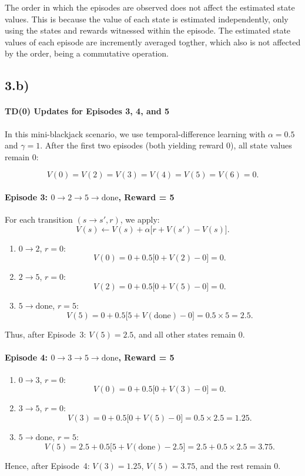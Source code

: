 \documentclass[11pt]{article}
\begin{document}
The order in which the episodes are observed does not affect the estimated state values. This is because the value of each state is estimated independently, 
only using the states and rewards witnessed within the episode. The estimated state values of each episode are incremently averaged togther, 
which also is not affected by the order, being a commutative operation.

\subsection*{3.b)}
\paragraph*{TD(0) Updates for Episodes 3, 4, and 5}

In this mini-blackjack scenario, we use temporal-difference learning with
$\alpha = 0.5$ and $\gamma = 1$. After the first two episodes (both yielding
reward 0), all state values remain 0:

\[
V(0) = V(2) = V(3) = V(4) = V(5) = V(6) = 0.
\]

\paragraph{Episode 3: \(0 \to 2 \to 5 \to \text{done}\), Reward = 5}
For each transition $(s \to s', r)$, we apply:
\[
V(s) \leftarrow V(s) + \alpha \bigl[r + V(s') - V(s)\bigr].
\]
\begin{enumerate}
\item \(0 \to 2\), \(r=0\):
\[
V(0) = 0 + 0.5 \bigl[0 + V(2) - 0\bigr] = 0.
\]
\item \(2 \to 5\), \(r=0\):
\[
V(2) = 0 + 0.5 \bigl[0 + V(5) - 0\bigr] = 0.
\]
\item \(5 \to \text{done}\), \(r=5\):
\[
V(5) = 0 + 0.5 \bigl[5 + V(\text{done}) - 0\bigr] 
      = 0.5 \times 5 
      = 2.5.
\]
\end{enumerate}
Thus, after Episode~3: \(V(5) = 2.5\), and all other states remain 0.

\paragraph*{Episode 4: \(0 \to 3 \to 5 \to \text{done}\), Reward = 5}
\begin{enumerate}
\item \(0 \to 3\), \(r=0\):
\[
V(0) = 0 + 0.5 \bigl[0 + V(3) - 0\bigr] = 0.
\]
\item \(3 \to 5\), \(r=0\):
\[
V(3) = 0 + 0.5 \bigl[0 + V(5) - 0\bigr]
      = 0.5 \times 2.5
      = 1.25.
\]
\item \(5 \to \text{done}\), \(r=5\):
\[
V(5) = 2.5 + 0.5 \bigl[5 + V(\text{done}) - 2.5\bigr]
      = 2.5 + 0.5 \times 2.5
      = 3.75.
\]
\end{enumerate}
Hence, after Episode~4: \(V(3) = 1.25\), \(V(5) = 3.75\), and the rest remain 0.
\end{document}
